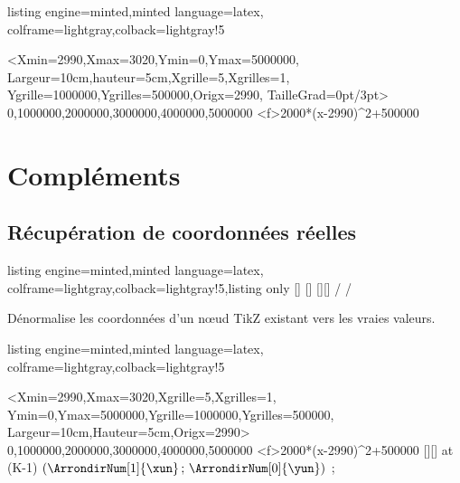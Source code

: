 \documentclass[11pt,a4paper]{ltxdoc}
\begin{document}
\begin{tcblisting}{listing engine=minted,minted language=latex,
  colframe=lightgray,colback=lightgray!5}
\begin{tkzGrph}%
    <Xmin=2990,Xmax=3020,Ymin=0,Ymax=5000000,
    Largeur=10cm,hauteur=5cm,Xgrille=5,Xgrilles=1,
    Ygrille=1000000,Ygrilles=500000,Origx=2990,%
    TailleGrad=0pt/3pt>
     {0,1000000,2000000,3000000,4000000,5000000}
  \tkzGrphDefinirCourbe[Nom=cf]<f>{2000*(x-2990)^2+500000}
\end{tkzGrph}
\end{tcblisting}

\pagebreak

\section{Compléments}

\subsection{Récupération de coordonnées réelles}

\begin{tcblisting}{listing engine=minted,minted language=latex,
  colframe=lightgray,colback=lightgray!5,listing only}
[\mavaleur]    %
[\mavaleur]    %
[\monx][\mony]
\tkzGrphRecupX / \tkzGrphRecupY / \tkzGrphRecupXY
\end{tcblisting}

Dénormalise les coordonnées d'un nœud TikZ existant vers les vraies valeurs.

\begin{tcblisting}{listing engine=minted,minted language=latex,
  colframe=lightgray,colback=lightgray!5}
\begin{tkzGrph}%
    <Xmin=2990,Xmax=3020,Xgrille=5,Xgrilles=1,
    Ymin=0,Ymax=5000000,Ygrille=1000000,Ygrilles=500000,
    Largeur=10cm,Hauteur=5cm,Origx=2990>
    {0,1000000,2000000,3000000,4000000,5000000}
  \tkzGrphDefineCurve[name=cf]<f>{2000*(x-2990)^2+500000}
  [\xun][\yun]
  \node[right,font=\small,rotate=90] at (K-1)
    {$(\ArrondirNum[1]{\xun}\,;\,\ArrondirNum[0]{\yun})$} ;
\end{tkzGrph}
\end{tcblisting}
\end{document}
